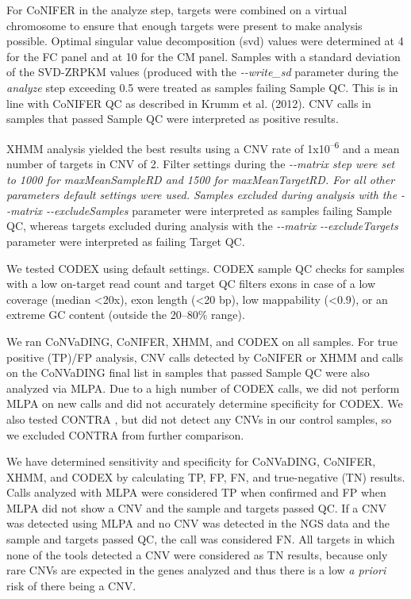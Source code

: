 For CoNIFER in the analyze step, targets were combined on a virtual chromosome to ensure that enough targets were present to make analysis possible. Optimal singular value decomposition (svd) values were determined at 4 for the FC panel and at 10 for the CM panel. 
Samples with a standard deviation of the SVD-ZRPKM values (produced with the \textsl{{-}{-}write\_sd} parameter during the \textsl{analyze} step \cite{Krumm_2012b} exceeding 0.5 were treated as samples failing Sample QC.
This is in line with CoNIFER QC as described in Krumm et al. (2012)\cite{Krumm_2012}. 
CNV calls in samples that passed Sample QC were interpreted as positive results. 

XHMM analysis yielded the best results using a CNV rate of 1x10\textsuperscript{–6} and a mean number of targets in CNV of 2. 
Filter settings during the \textsl{{{-}{-}matrix} step \cite{Fromer_2012b} were set to 1000 for \textsl{maxMeanSampleRD} and 1500 for \textsl{maxMeanTargetRD}. 
For all other parameters default settings were used. 
Samples excluded during analysis with the \textsl{{-}{-}matrix} \textsl{{-}{-}}excludeSamples} parameter \cite{Fromer_2012b} were interpreted as samples failing Sample QC, whereas targets excluded during analysis with the \textsl{{-}{-}matrix} \textsl{{-}{-}excludeTargets} parameter \cite{Fromer_2012b} were interpreted as failing Target QC. 

We tested CODEX using default settings. 
CODEX sample QC checks for samples with a low on-target read count and target QC filters exons in case of a low coverage (median \textless20x), exon length (\textless20 bp), low mappability (\textless0.9), or an extreme GC content (outside the 20–80\% range). 

We ran CoNVaDING, CoNIFER, XHMM, and CODEX on all samples. For true positive (TP)/FP analysis, CNV calls detected by CoNIFER or XHMM and calls on the CoNVaDING final list in samples that passed Sample QC were also analyzed via MLPA. 
Due to a high number of CODEX calls, we did not perform MLPA on new calls and did not accurately determine specificity for CODEX. 
We also tested CONTRA \cite{Li_2012}, but did not detect any CNVs in our control samples, so we excluded CONTRA from further comparison. 

We have determined sensitivity and specificity for CoNVaDING, CoNIFER, XHMM, and CODEX by calculating TP, FP, FN, and true-negative (TN) results. 
Calls analyzed with MLPA were considered TP when confirmed and FP when MLPA did not show a CNV and the sample and targets passed QC. 
If a CNV was detected using MLPA and no CNV was detected in the NGS data and the sample and targets passed QC, the call was considered FN. 
All targets in which none of the tools detected a CNV were considered as TN results, because only rare CNVs are expected in the genes analyzed and thus there is a low \textsl{a priori} risk of there being a CNV.

